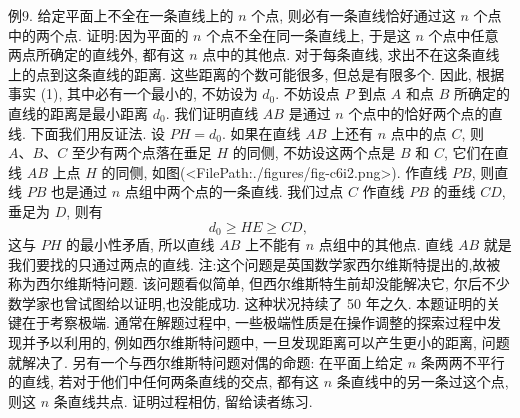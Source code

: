 例9. 给定平面上不全在一条直线上的 $n$ 个点, 则必有一条直线恰好通过这 $n$ 个点中的两个点.
证明:因为平面的 $n$ 个点不全在同一条直线上, 于是这 $n$ 个点中任意两点所确定的直线外, 都有这 $n$ 点中的其他点.
对于每条直线, 求出不在这条直线上的点到这条直线的距离.
这些距离的个数可能很多, 但总是有限多个.
因此, 根据事实 (1), 其中必有一个最小的, 不妨设为 $d_0$.
不妨设点 $P$ 到点 $A$ 和点 $B$ 所确定的直线的距离是最小距离 $d_0$. 我们证明直线 $A B$ 是通过 $n$ 个点中的恰好两个点的直线.
下面我们用反证法.
设 $P H=d_0$. 如果在直线 $A B$ 上还有 $n$ 点中的点 $C$, 则 $A 、 B 、 C$ 至少有两个点落在垂足 $H$ 的同侧, 不妨设这两个点是 $B$ 和 $C$, 它们在直线 $A B$ 上点 $H$ 的同侧, 如图(<FilePath:./figures/fig-c6i2.png>). 作直线 $P B$, 则直线 $P B$ 也是通过 $n$ 点组中两个点的一条直线.
我们过点 $C$ 作直线 $P B$ 的垂线 $C D$, 垂足为 $D$, 则有
$$
d_0 \geqslant H E \geqslant C D \text {, }
$$
这与 $P H$ 的最小性矛盾, 所以直线 $A B$ 上不能有 $n$ 点组中的其他点.
直线 $A B$ 就是我们要找的只通过两点的直线.
注:这个问题是英国数学家西尔维斯特提出的,故被称为西尔维斯特问题.
该问题看似简单, 但西尔维斯特生前却没能解决它, 尔后不少数学家也曾试图给以证明,也没能成功.
这种状况持续了 50 年之久.
本题证明的关键在于考察极端.
通常在解题过程中, 一些极端性质是在操作调整的探索过程中发现并予以利用的, 例如西尔维斯特问题中, 一旦发现距离可以产生更小的距离, 问题就解决了.
另有一个与西尔维斯特问题对偶的命题: 在平面上给定 $n$ 条两两不平行的直线, 若对于他们中任何两条直线的交点, 都有这 $n$ 条直线中的另一条过这个点,则这 $n$ 条直线共点.
证明过程相仿, 留给读者练习.


